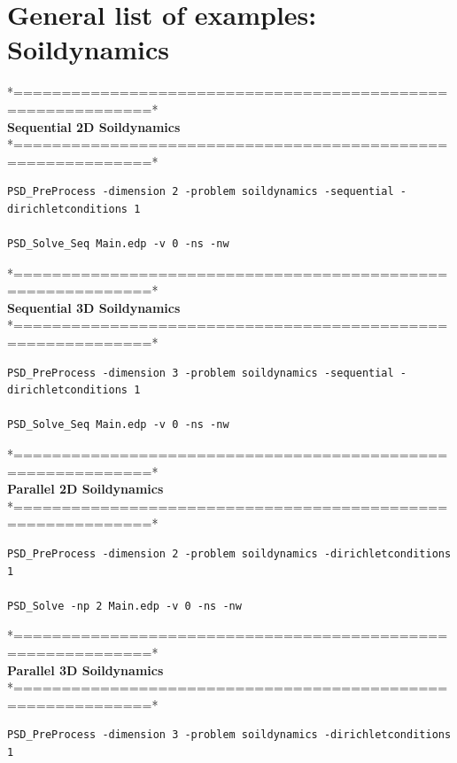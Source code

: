{{\section{General list of examples: Soildynamics} 

*============================================================*\\
\textbf{ Sequential 2D Soildynamics }    \\                   
*============================================================*\\

\begin{lstlisting}[style=Linux]
PSD_PreProcess -dimension 2 -problem soildynamics -sequential -dirichletconditions 1  

PSD_Solve_Seq Main.edp -v 0 -ns -nw
\end{lstlisting}
*============================================================*\\
\textbf{ Sequential 3D Soildynamics  }  \\                    
*============================================================*\\

\begin{lstlisting}[style=Linux]
PSD_PreProcess -dimension 3 -problem soildynamics -sequential -dirichletconditions 1  

PSD_Solve_Seq Main.edp -v 0 -ns -nw
\end{lstlisting}
*============================================================*\\
\textbf{ Parallel 2D Soildynamics  }  \\                    
*============================================================*\\

\begin{lstlisting}[style=Linux]
PSD_PreProcess -dimension 2 -problem soildynamics -dirichletconditions 1  

PSD_Solve -np 2 Main.edp -v 0 -ns -nw
\end{lstlisting}
*============================================================*\\
\textbf{ Parallel 3D Soildynamics  }     \\                 
*============================================================*\\

\begin{lstlisting}[style=Linux]
PSD_PreProcess -dimension 3 -problem soildynamics -dirichletconditions 1  


\end{lstlisting}}}
